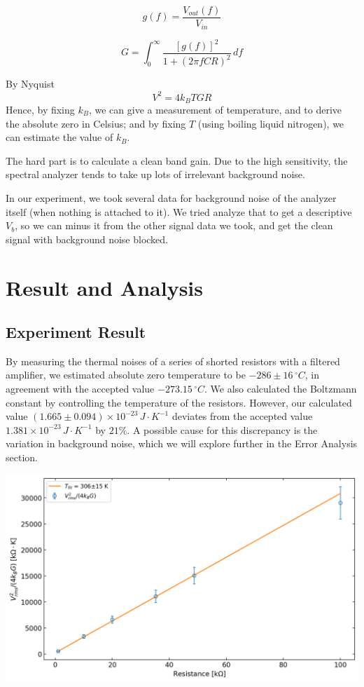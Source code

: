 \documentclass[a4paper]{tufte-handout}
\begin{document}
$$g(f) = \frac{V_{out}(f)}{V_{in}}$$

$$G=\int_{0}^{\infty} \frac{[g(f)]^2}{1+(2\pi fCR)^2} \,df$$

By Nyquist
$$V^2=4k_BTGR$$
\quad Hence, by fixing $k_B$, we can give a measurement of temperature, and to derive the absolute zero in Celsius; and by fixing $T$ (using boiling liquid nitrogen), we can estimate the value of $k_B$.

The hard part is to calculate a clean band gain. Due to the high sensitivity, the spectral analyzer tends to take up lots of irrelevant background noise. 

In our experiment, we took several data for background noise of the analyzer itself (when nothing is attached to it). We tried analyze that to get a descriptive $V_b$, so we can minus it from the other signal data we took, and get the clean signal with background noise blocked. 

\newpage
\section{Result and Analysis}
\subsection{Experiment Result}
\quad By measuring the thermal noises of a series of shorted resistors with a filtered amplifier, we estimated absolute zero temperature to be $-286 \pm 16 \,\si{^\circ C}$, in agreement with the accepted value $-273.15\,\si{^\circ C}$. We also calculated the Boltzmann constant by controlling the temperature of the resistors. However, our calculated value $(1.665\pm 0.094)\times 10^{-23}\,\si{J\cdot K^{-1}}$ deviates from the accepted value $1.381\times 10^{-23}\,\si{J\cdot K^{-1}}$ by $21\%$. A possible cause for this discrepancy is the variation in background noise, which we will explore further in the Error Analysis section.

\includegraphics[width = 1\textwidth]{figures/room_temp.png}
\end{document}
